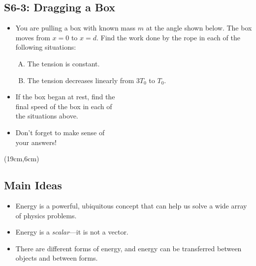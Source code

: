 \documentclass[]{article}
\begin{document}
\begin{PresentSpace}
\vspace{-10pt}
\section*{S6-3: Dragging a Box}
\vspace{-10pt}
\begin{itemize}
	\item You are pulling a box with known mass $m$ at the angle shown below. The box moves from $x=0$ to $x=d$. Find the work done by the rope in each of the following situations:
	\begin{enumerate}[(A)]
		\item The tension is constant.
		\item The tension decreases linearly from $3T_{0}$ to $T_{0}$.
	\end{enumerate}
	\item If the box began at rest, find the \\
	final speed of the box in each of \\
	the situations above.
	\item Don't forget to make sense of \\
	your answers!
\end{itemize}
\end{PresentSpace}
\begin{textblock*}{10cm}(19cm,6cm)
\begin{center}
	\normalsize
\end{center}
\end{textblock*}
\newpage
\begin{TeacherMargin}

\end{TeacherMargin}
\begin{PresentSpace}
\section*{Main Ideas}
\begin{itemize}
	\item Energy is a powerful, ubiquitous concept that can help us solve a wide array of physics problems.
	\item Energy is a \textit{scalar}---it is not a vector.
	\item There are different forms of energy, and energy can be transferred between objects and between forms.
\end{itemize}
\end{PresentSpace}
\end{document}
